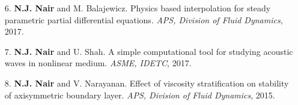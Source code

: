 \documentclass[margin]{res}
\begin{document}
\begin{resume}
\begin{itemize}
 \item[6.] \textbf{N.J. Nair} and M. Balajewicz. Physics based interpolation for steady parametric partial differential equations. \textit{APS, Division of Fluid Dynamics}, 2017.
 
 \item[7.] \textbf{N.J. Nair} and U. Shah. A simple computational tool for studying acoustic waves in nonlinear medium. \textit{ASME, IDETC}, 2017.
 
 \item[8.] \textbf{N.J. Nair} and V. Narayanan. Effect of viscosity stratification on stability of axisymmetric boundary layer. \textit{APS, Division of Fluid Dynamics}, 2015.
  
\end{itemize}
		 
%
%
		 

\end{resume}
\end{document}

